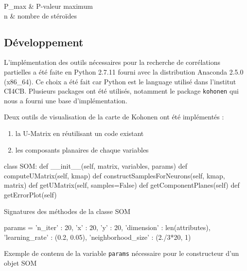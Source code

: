     \begin{conditions}
    P_{max} & P-valeur maximum \\
    n & nombre de stéroïdes
    \end{conditions}

    \subsection{Développement}
    \label{sct:dev}

    L'implémentation des outils nécessaires pour la recherche de corrélations partielles a été faite en Python 2.7.11 fourni avec la distribution Anaconda 2.5.0 (x86\_64). Ce choix a été fait car Python est le language utilisé dans l'institut CI4CB. Plusieurs packages ont été utilisés, notamment le package \texttt{kohonen} qui nous a fourni une base d'implémentation.

    Deux outils de visualisation de la carte de Kohonen ont été implémentés :   

    \begin{enumerate}
        \item la U-Matrix en réutilisant un code existant 
        \item les composants planaires de chaque variables
    \end{enumerate}



    \begin{listing}[H]
    \begin{pythoncode}
    class SOM:
        def __init__(self, matrix, variables, params)
        def computeUMatrix(self, kmap)
        def constructSamplesForNeurons(self, kmap, matrix)
        def getUMatrix(self, samples=False)
        def getComponentPlanes(self)
        def getErrorPlot(self)
    \end{pythoncode}
    \caption{Signatures des méthodes de la classe SOM}
    \label{lst:somClass}
    \end{listing}

    \begin{listing}[H]
    \begin{pythoncode}
    params = {
                'n_iter' : 20, 
                'x' : 20,
                'y' : 20,
                'dimension' : len(attributes),
                'learning_rate' : (0.2, 0.05),
                'neighborhood_size' : (2./3*20, 1) 
            }
    \end{pythoncode}
    \caption{Exemple de contenu de la variable \texttt{params} nécessaire pour le constructeur d'un objet SOM}
    \label{lst:somParams}
    \end{listing}